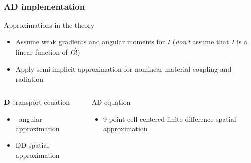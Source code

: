 \documentclass{beamer}
\begin{document}
\begin{frame}
  \frametitle{AD implementation}
  \begin{block}{Approximations in the theory}
    \begin{itemize}
      \item Assume weak gradients and angular moments for $I$ (\emph{don't}
        assume that $I$ is a linear function of $\vec{\Omega}$!)
      \item Apply semi-implicit approximation for nonlinear material coupling
        and radiation
    \end{itemize}
  \end{block}
  \vspace{-\baselineskip}
  \begin{columns}[t]
    \begin{column}{.48\textwidth}
\begin{block}{$\mathbf{D}$ transport equation}
  \begin{itemize}
    \item \SN\ angular approximation
    \item DD spatial approximation
  \end{itemize}
\end{block}
    \end{column}
    \begin{column}{.48\textwidth}
\begin{block}{AD equation}
  \begin{itemize}
    \item 9-point cell-centered finite difference spatial approximation
  \end{itemize}
\end{block}
    \end{column}
  \end{columns}
\end{frame}

\end{document}
